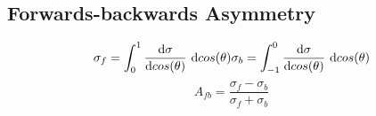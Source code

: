 \subsection{Forwards-backwards Asymmetry}
\begin{equation}
\sigma_f=\int_{0}^{1}\frac{\text{d}\sigma}{\text{d}cos(\theta)}~\text{d}cos(\theta) \\
\sigma_b=\int_{-1}^{0}\frac{\text{d}\sigma}{\text{d}cos(\theta)}~\text{d}cos(\theta)
\end{equation}
\begin{equation}
A_{fb}=\frac{\sigma_f-\sigma_b}{\sigma_f+\sigma_b}
\end{equation}
